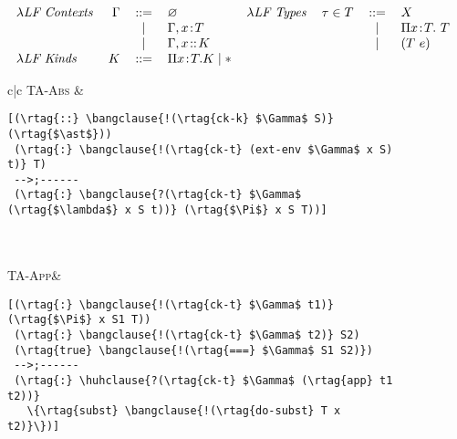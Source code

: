 \begin{figure}
\begin{displaymath}
\begin{tabular}{lrcllrcl}
\textit{\lf{} Contexts}& $\Gamma$ & $::=$ & $\varnothing$ &\textit{\lf{} Types} & $\tau \in T$ & $::=$& $X$ \\
&     &  $\mid$ & $\Gamma, x \! : \! T$ & && $\mid$& $\Pi x \! : \! T.~ T$ \\
&     &  $\mid$ & $\Gamma, x \! ::\!  K$ & &&$\mid$& $(T~ e)$ \\
\textit{\lf{} Kinds} & $K$ & $::=$ & $\Pi x \! : \! T. K \mid \ast$ \\ 
\end{tabular}
\end{displaymath}
\begin{tabular}{c|c}
{{\small\textsc{TA-Abs}}\quad{}} \quad& 
\begin{minipage}{2.5in}
{\footnotesize
\begin{Verbatim}[baselinestretch=.8,commandchars=\\\{\},codes={\catcode`$=3\catcode`^=7}]
[(\rtag{::} \bangclause{!(\rtag{ck-k} $\Gamma$ S)} (\rtag{$\ast$}))
 (\rtag{:} \bangclause{!(\rtag{ck-t} (ext-env $\Gamma$ x S) t)} T)
 -->;------
 (\rtag{:} \bangclause{?(\rtag{ck-t} $\Gamma$ (\rtag{$\lambda$} x S t))} (\rtag{$\Pi$} x S T))]
\end{Verbatim}
}\end{minipage}
\\
\\
  {{\small\textsc{TA-App}}\quad{}}\quad&
\begin{minipage}{2.5in}
{\footnotesize
\begin{Verbatim}[baselinestretch=.8,commandchars=\\\{\},codes={\catcode`$=3\catcode`^=7}]
[(\rtag{:} \bangclause{!(\rtag{ck-t} $\Gamma$ t1)} (\rtag{$\Pi$} x S1 T))
 (\rtag{:} \bangclause{!(\rtag{ck-t} $\Gamma$ t2)} S2)
 (\rtag{true} \bangclause{!(\rtag{===} $\Gamma$ S1 S2)})
 -->;------
 (\rtag{:} \huhclause{?(\rtag{ck-t} $\Gamma$ (\rtag{app} t1 t2))}
   \{\rtag{subst} \bangclause{!(\rtag{do-subst} T x t2)}\})]

\end{Verbatim}}
\end{minipage}
\end{tabular}
\end{figure}
